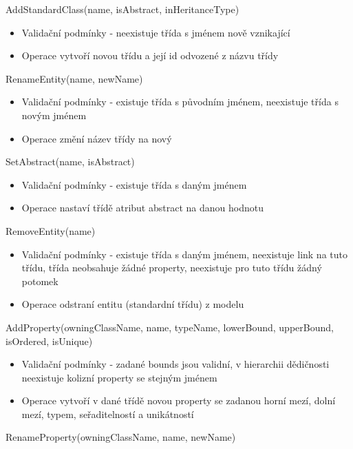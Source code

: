 \documentclass[11pt,twoside,a4paper]{book}
\begin{document}
\begin{list}{Operace :}{}
  \item AddStandardClass(name, isAbstract, inHeritanceType)
  \begin{itemize}
    \item Validační podmínky - neexistuje třída s jménem nově vznikající
    \item Operace vytvoří novou třídu a její id odvozené z názvu třídy
  \end{itemize}
  \item RenameEntity(name, newName)
  \begin{itemize}
    \item Validační podmínky - existuje třída s původním jménem, neexistuje
    třída s novým jménem
    \item Operace změní název třídy na nový
  \end{itemize}
  \item SetAbstract(name, isAbstract)
  \begin{itemize}
    \item Validační podmínky - existuje třída s daným jménem
    \item Operace nastaví třídě atribut abstract na danou hodnotu    
  \end{itemize}
  \item RemoveEntity(name)
  \begin{itemize}
    \item Validační podmínky - existuje třída s daným jménem, neexistuje link na
    tuto třídu, třída neobsahuje žádné property, neexistuje pro tuto třídu žádný potomek
    \item Operace odstraní entitu (standardní třídu) z modelu
  \end{itemize}
  \item AddProperty(owningClassName, name, typeName, lowerBound, upperBound,
  isOrdered, isUnique) 
  \begin{itemize}
    \item Validační podmínky - zadané bounds jsou validní, v hierarchii
    dědičnosti neexistuje kolizní property se stejným jménem
    \item  Operace vytvoří v dané třídě novou property se zadanou horní mezí,
    dolní mezí, typem, seřaditelností a unikátností
  \end{itemize}
  \item RenameProperty(owningClassName, name, newName)
  \begin{itemize}

\end{itemize}
\end{list}
\end{document}

